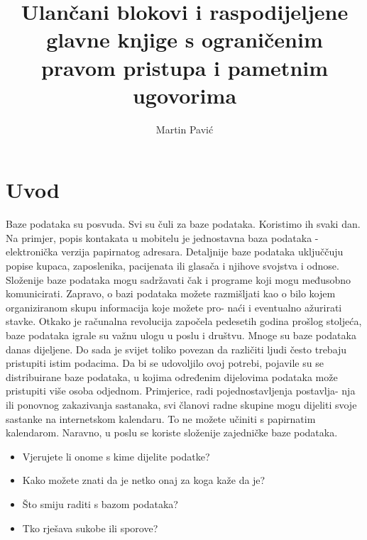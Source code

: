 \documentclass[times, utf8, diplomski]{fer}
\begin{document}

\title{Ulančani blokovi i raspodijeljene glavne knjige s ograničenim pravom pristupa i pametnim ugovorima}

\author{Martin Pavić}

\maketitle

\izvornik

\zahvala{}

\tableofcontents

\chapter{Uvod}
Baze podataka su posvuda. Svi su čuli za baze podataka. Koristimo ih svaki dan. Na primjer, popis kontakata u mobitelu je jednostavna baza podataka - elektronička verzija papirnatog adresara. Detaljnije baze podataka uključčuju popise kupaca, zaposlenika, pacijenata ili glasača i njihove svojstva i odnose. Složenije baze podataka mogu sadržavati čak i programe koji mogu međusobno komunicirati. Zapravo, o bazi podataka možete razmišljati kao o bilo kojem organiziranom skupu informacija koje možete pro- naći i eventualno ažurirati stavke. Otkako je računalna revolucija započela pedesetih godina prošlog stoljeća, baze podataka igrale su važnu ulogu u poslu i društvu.
Mnoge su baze podataka danas dijeljene. Do sada je svijet toliko povezan da različiti ljudi često trebaju pristupiti istim podacima. Da bi se udovoljilo ovoj potrebi, pojavile su se distribuirane baze podataka, u kojima određenim dijelovima podataka može pristupiti više osoba odjednom. Primjerice, radi pojednostavljenja postavlja- nja ili ponovnog zakazivanja sastanaka, svi članovi radne skupine mogu dijeliti svoje sastanke na internetskom kalendaru. To ne možete učiniti s papirnatim kalendarom. Naravno, u poslu se koriste složenije zajedničke baze podataka.

\begin{itemize}

\item Vjerujete li onome s kime dijelite podatke?

\item Kako možete znati da je netko onaj za koga kaže da je?

\item Što smiju raditi s bazom podataka?

\item Tko rješava sukobe ili sporove?

\end{itemize}
\end{document}
